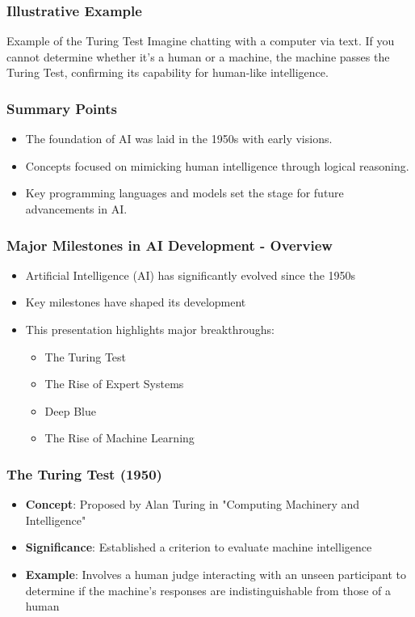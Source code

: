 \documentclass[aspectratio=169]{beamer}
\begin{document}
\begin{frame}[fragile]
    \frametitle{Illustrative Example}
    \begin{block}{Example of the Turing Test}
        Imagine chatting with a computer via text. If you cannot determine whether it's a human or a machine, the machine passes the Turing Test, confirming its capability for human-like intelligence.
    \end{block}
\end{frame}

\begin{frame}[fragile]
    \frametitle{Summary Points}
    \begin{itemize}
        \item The foundation of AI was laid in the 1950s with early visions.
        \item Concepts focused on mimicking human intelligence through logical reasoning.
        \item Key programming languages and models set the stage for future advancements in AI.
    \end{itemize}
\end{frame}

\begin{frame}[fragile]
    \frametitle{Major Milestones in AI Development - Overview}
    \begin{itemize}
        \item Artificial Intelligence (AI) has significantly evolved since the 1950s
        \item Key milestones have shaped its development
        \item This presentation highlights major breakthroughs:
        \begin{itemize}
            \item The Turing Test
            \item The Rise of Expert Systems
            \item Deep Blue
            \item The Rise of Machine Learning
        \end{itemize}
    \end{itemize}
\end{frame}

\begin{frame}[fragile]
    \frametitle{The Turing Test (1950)}
    \begin{itemize}
        \item \textbf{Concept}: Proposed by Alan Turing in "Computing Machinery and Intelligence"
        \item \textbf{Significance}: Established a criterion to evaluate machine intelligence
        \item \textbf{Example}: Involves a human judge interacting with an unseen participant to determine if the machine's responses are indistinguishable from those of a human
    \end{itemize}
\end{frame}
\end{document}
